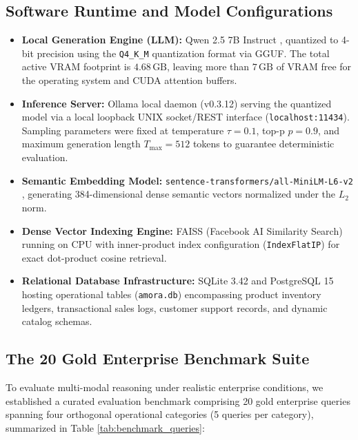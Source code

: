 \subsection{Software Runtime and Model Configurations}
\begin{itemize}
    \item \textbf{Local Generation Engine (LLM):} Qwen 2.5 7B Instruct \cite{bai2023qwen}, quantized to 4-bit precision using the \texttt{Q4\_K\_M} quantization format via GGUF. The total active VRAM footprint is $4.68\,\text{GB}$, leaving more than $7\,\text{GB}$ of VRAM free for the operating system and CUDA attention buffers.
    \item \textbf{Inference Server:} Ollama local daemon (v0.3.12) serving the quantized model via a local loopback UNIX socket/REST interface (\texttt{localhost:11434}). Sampling parameters were fixed at temperature $\tau = 0.1$, top-p $p = 0.9$, and maximum generation length $T_{\text{max}} = 512$ tokens to guarantee deterministic evaluation.
    \item \textbf{Semantic Embedding Model:} \texttt{sentence-transformers/all-MiniLM-L6-v2} \cite{reimers2019sentencebert}, generating 384-dimensional dense semantic vectors normalized under the $L_2$ norm.
    \item \textbf{Dense Vector Indexing Engine:} FAISS (Facebook AI Similarity Search) \cite{johnson2019billion} running on CPU with inner-product index configuration (\texttt{IndexFlatIP}) for exact dot-product cosine retrieval.
    \item \textbf{Relational Database Infrastructure:} SQLite 3.42 and PostgreSQL 15 hosting operational tables (\texttt{amora.db}) encompassing product inventory ledgers, transactional sales logs, customer support records, and dynamic catalog schemas.
\end{itemize}

\subsection{The 20 Gold Enterprise Benchmark Suite}
To evaluate multi-modal reasoning under realistic enterprise conditions, we established a curated evaluation benchmark comprising 20 gold enterprise queries spanning four orthogonal operational categories (5 queries per category), summarized in Table \ref{tab:benchmark_queries}:

